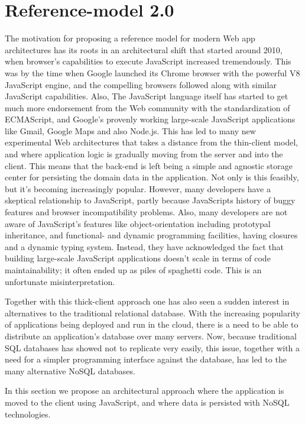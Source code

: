 \section{Reference-model 2.0}
The motivation for proposing a reference model for modern Web app architectures has its roots in an architectural shift that started around 2010, when browser's capabilities to execute JavaScript increased tremendously. This was by the time when Google launched its Chrome browser with the powerful V8 JavaScript engine, and the compelling browsers followed along with similar JavaScript capabilities. Also, The JavaScript language itself has started to get much more endorsement from the Web community with the standardization of ECMAScript, and Google's provenly working large-scale JavaScript applications like Gmail, Google Maps and also Node.js. This has led to many new experimental Web architectures that takes a distance from the thin-client model, and where application logic is gradually moving from the server and into the client. This means that the back-end is left being a simple and agnostic storage center for persisting the domain data in the application. Not only is this feasibly, but it's becoming increasingly popular. However, many developers have a skeptical relationship to JavaScript, partly because JavaScripts history of buggy features and browser incompatibility problems. Also, many developers are not aware of JavaScript's features like object-orientation including prototypal inheritance, and functional- and dynamic programming facilities, having closures and a dynamic typing system. Instead, they have acknowledged the fact that building large-scale JavaScript applications doesn't scale in terms of code maintainability; it often ended up as piles of spaghetti code\cite{spagethi}. This is an unfortunate misinterpretation. 

Together with this thick-client approach one has also seen a sudden interest in alternatives to the traditional relational database. With the increasing popularity of applications being deployed and run in the cloud, there is a need to be able to distribute an application's database over many servers. Now, because traditional SQL databases has showed not to replicate very easily\cite{cloudmanagement}, this issue, together with a need for a simpler programming interface against the database, has led to the many alternative NoSQL databases. 

In this section we propose an architectural approach where the application is moved to the client using JavaScript, and where data is persisted with NoSQL technologies.

